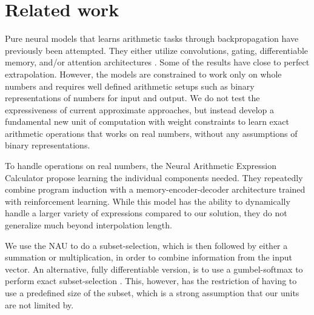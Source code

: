 \section{Related work}
Pure neural models that learns arithmetic tasks through backpropagation have previously been attempted.
They either utilize convolutions, gating, differentiable memory, and/or attention architectures \cite{NeuralGPU,GridLSTM,NTM}.
Some of the results have close to perfect extrapolation. However, the models are constrained to work only on whole numbers and requires well defined arithmetic setups such as binary representations of numbers for input and output.
We do not test the expressiveness of current approximate approaches, but instead develop a fundamental new unit of computation with weight constraints to learn exact arithmetic operations that works on real numbers, without any assumptions of binary representations.

To handle operations on real numbers, the Neural Arithmetic Expression Calculator \cite{NAEC} propose learning the individual components needed.
They repeatedly combine program induction with a memory-encoder-decoder architecture trained with reinforcement learning.
While this model has the ability to dynamically handle a larger variety of expressions compared to our solution, they do not generalize much beyond interpolation length.

We use the NAU to do a subset-selection, which is then followed by either a summation or multiplication, in order to combine information from the input vector.
An alternative, fully differentiable version, is to use a gumbel-softmax to perform exact subset-selection \cite{DSS}.
This, however, has the restriction of having to use a predefined size of the subset, which is a strong assumption that our units are not limited by.

